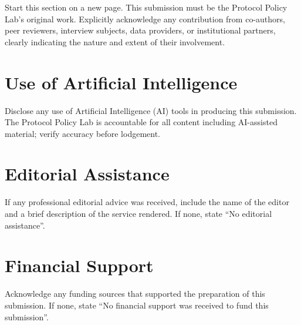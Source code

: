\begin{instructional}
Start this section on a new page. This submission must be the Protocol Policy Lab's original work. Explicitly acknowledge any contribution from co-authors, peer reviewers, interview subjects, data providers, or institutional partners, clearly indicating the nature and extent of their involvement.
\end{instructional}


\section{Use of Artificial Intelligence}

\begin{instructional}
Disclose any use of Artificial Intelligence (AI) tools in producing this submission. The Protocol Policy Lab is accountable for all content including AI-assisted material; verify accuracy before lodgement.
\end{instructional}


\section{Editorial Assistance}

\begin{instructional}
If any professional editorial advice was received, include the name of the editor and a brief description of the service rendered. If none, state ``No editorial assistance''.
\end{instructional}


\section{Financial Support}

\begin{instructional}
Acknowledge any funding sources that supported the preparation of this submission. If none, state ``No financial support was received to fund this submission''.
\end{instructional}


